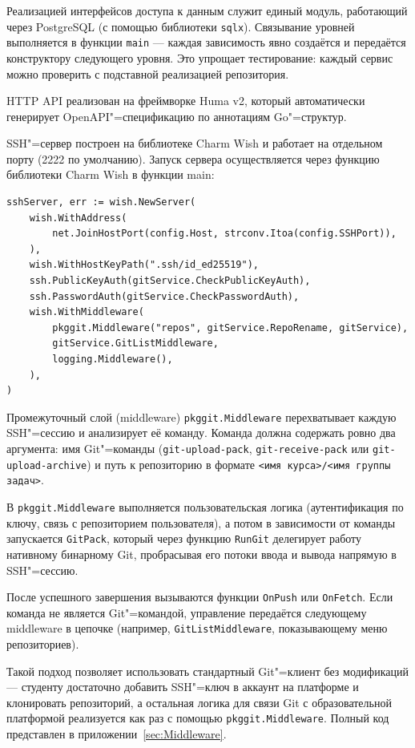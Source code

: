 \documentclass[coursework]{SCWorks}
\begin{document}
Реализацией интерфейсов доступа к данным служит единый модуль, работающий через PostgreSQL (с помощью библиотеки \texttt{sqlx}). Связывание уровней выполняется в функции \texttt{main} --- каждая зависимость явно создаётся и передаётся конструктору следующего уровня. Это упрощает тестирование: каждый сервис можно проверить с подставной реализацией репозитория.

HTTP API реализован на фреймворке Huma v2, который автоматически генерирует OpenAPI"=спецификацию по аннотациям Go"=структур.

SSH"=сервер построен на библиотеке Charm Wish и работает на отдельном порту (2222 по умолчанию). Запуск сервера осуществляется через функцию библиотеки Charm Wish в функции main:

\begin{verbatim}
sshServer, err := wish.NewServer(
    wish.WithAddress(
        net.JoinHostPort(config.Host, strconv.Itoa(config.SSHPort)),
    ),
    wish.WithHostKeyPath(".ssh/id_ed25519"),
    ssh.PublicKeyAuth(gitService.CheckPublicKeyAuth),
    ssh.PasswordAuth(gitService.CheckPasswordAuth),
    wish.WithMiddleware(
        pkggit.Middleware("repos", gitService.RepoRename, gitService),
        gitService.GitListMiddleware,
        logging.Middleware(),
    ),
)
\end{verbatim}

Промежуточный слой (middleware) \texttt{pkggit.Middleware} перехватывает каждую SSH"=сессию и анализирует её команду. Команда должна содержать ровно два аргумента: имя Git"=команды (\texttt{git-upload-pack}, \texttt{git-receive-pack} или \texttt{git-upload-archive}) и путь к репозиторию в формате \texttt{<имя курса>/<имя группы задач>}.

В \texttt{pkggit.Middleware} выполняется пользовательская логика (аутентификация по ключу, связь с репозиторием пользователя), а потом в зависимости от команды запускается \texttt{GitPack}, который через функцию \texttt{RunGit} делегирует работу нативному бинарному Git, пробрасывая его потоки ввода и вывода напрямую в SSH"=сессию.

После успешного завершения вызываются функции \texttt{OnPush} или \texttt{OnFetch}. Если команда не является Git"=командой, управление передаётся следующему middleware в цепочке (например, \texttt{GitListMiddleware}, показывающему меню репозиториев).

Такой подход позволяет использовать стандартный Git"=клиент без модификаций --- студенту достаточно добавить SSH"=ключ в аккаунт на платформе и клонировать репозиторий, а остальная логика для связи Git с образовательной платформой реализуется как раз с помощью \texttt{pkggit.Middleware}. Полный код представлен в приложении~\ref{sec:Middleware}.
\end{document}
